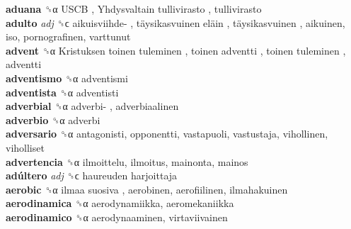\textbf{aduana} ␝α   USCB ,  Yhdysvaltain tullivirasto , tullivirasto  \\
\textbf{adulto} \emph{adj}  ␝ϲ   aikuisviihde- ,  täysikasvuinen eläin ,  täysikasvuinen , aikuinen, iso, pornografinen, varttunut  \\
\textbf{advent} ␝α   Kristuksen toinen tuleminen ,  toinen adventti ,  toinen tuleminen , adventti  \\
\textbf{adventismo} ␝α  adventismi  \\
\textbf{adventista} ␝α  adventisti  \\
\textbf{adverbial} ␝α   adverbi- , adverbiaalinen  \\
\textbf{adverbio} ␝α  adverbi  \\
\textbf{adversario} ␝α  antagonisti, opponentti, vastapuoli, vastustaja, vihollinen, viholliset  \\
\textbf{advertencia} ␝α  ilmoittelu, ilmoitus, mainonta, mainos  \\
\textbf{adúltero} \emph{adj}  ␝ϲ   haureuden harjoittaja   \\
\textbf{aerobic} ␝α   ilmaa suosiva , aerobinen, aerofiilinen, ilmahakuinen  \\
\textbf{aerodinamica} ␝α  aerodynamiikka, aeromekaniikka  \\
\textbf{aerodinamico} ␝α  aerodynaaminen, virtaviivainen  \\

